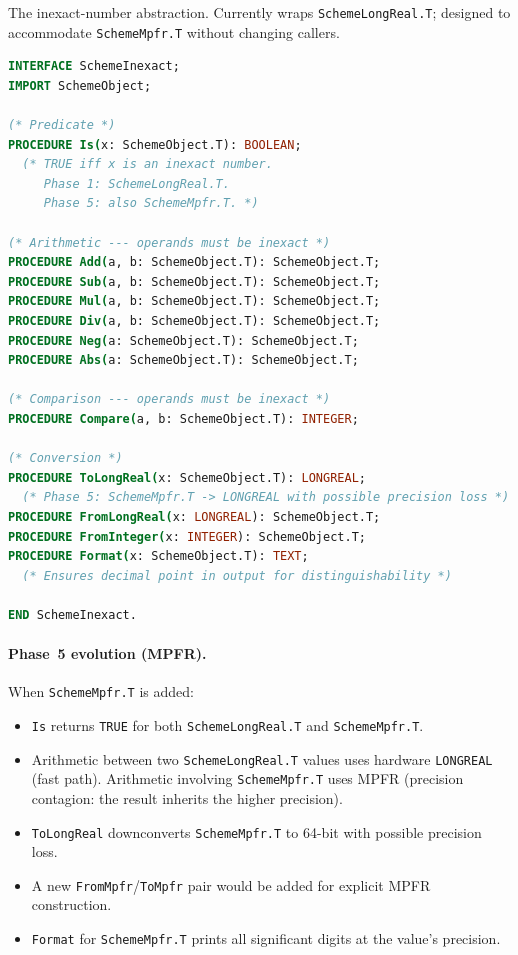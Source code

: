 \documentclass[12pt]{article}
\begin{document}
The inexact-number abstraction.  Currently wraps
{\tt SchemeLongReal.T}; designed to accommodate {\tt SchemeMpfr.T}
without changing callers.

\begin{lstlisting}[language=Modula3]
INTERFACE SchemeInexact;
IMPORT SchemeObject;

(* Predicate *)
PROCEDURE Is(x: SchemeObject.T): BOOLEAN;
  (* TRUE iff x is an inexact number.
     Phase 1: SchemeLongReal.T.
     Phase 5: also SchemeMpfr.T. *)

(* Arithmetic --- operands must be inexact *)
PROCEDURE Add(a, b: SchemeObject.T): SchemeObject.T;
PROCEDURE Sub(a, b: SchemeObject.T): SchemeObject.T;
PROCEDURE Mul(a, b: SchemeObject.T): SchemeObject.T;
PROCEDURE Div(a, b: SchemeObject.T): SchemeObject.T;
PROCEDURE Neg(a: SchemeObject.T): SchemeObject.T;
PROCEDURE Abs(a: SchemeObject.T): SchemeObject.T;

(* Comparison --- operands must be inexact *)
PROCEDURE Compare(a, b: SchemeObject.T): INTEGER;

(* Conversion *)
PROCEDURE ToLongReal(x: SchemeObject.T): LONGREAL;
  (* Phase 5: SchemeMpfr.T -> LONGREAL with possible precision loss *)
PROCEDURE FromLongReal(x: LONGREAL): SchemeObject.T;
PROCEDURE FromInteger(x: INTEGER): SchemeObject.T;
PROCEDURE Format(x: SchemeObject.T): TEXT;
  (* Ensures decimal point in output for distinguishability *)

END SchemeInexact.
\end{lstlisting}

\paragraph{Phase~5 evolution (MPFR).}
When {\tt SchemeMpfr.T} is added:
\begin{itemize}[nosep]
\item {\tt Is} returns {\tt TRUE} for both {\tt SchemeLongReal.T}
  and {\tt SchemeMpfr.T}.
\item Arithmetic between two {\tt SchemeLongReal.T} values uses
  hardware {\tt LONGREAL} (fast path).  Arithmetic involving
  {\tt SchemeMpfr.T} uses MPFR (precision contagion: the result
  inherits the higher precision).
\item {\tt ToLongReal} downconverts {\tt SchemeMpfr.T} to 64-bit
  with possible precision loss.
\item A new {\tt FromMpfr}/{\tt ToMpfr} pair would be added for
  explicit MPFR construction.
\item {\tt Format} for {\tt SchemeMpfr.T} prints all significant
  digits at the value's precision.
\end{itemize}
\end{document}

